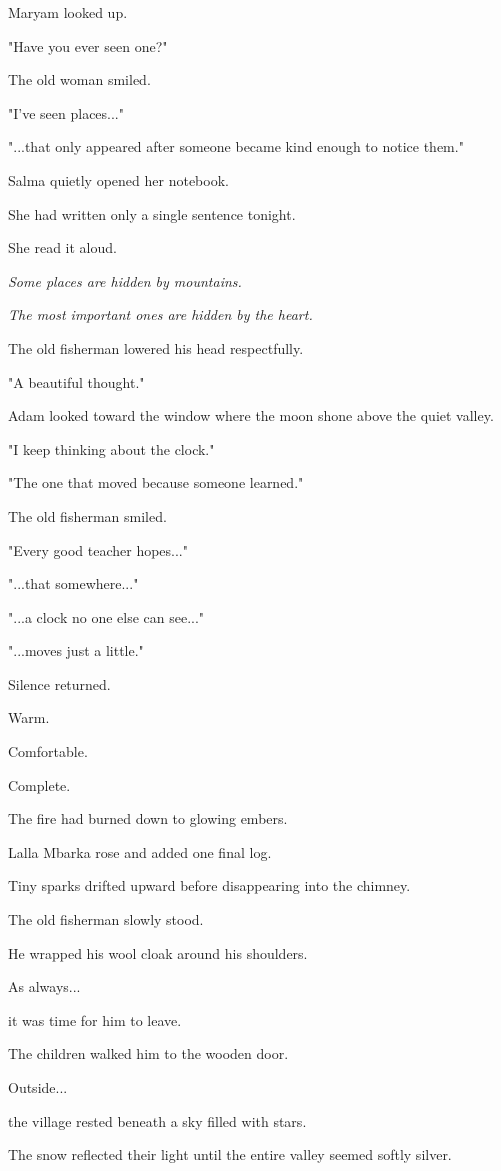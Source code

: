 \documentclass[12pt,openany]{book}
\begin{document}
Maryam looked up.

"Have you ever seen one?"

The old woman smiled.

"I've seen places..."

"...that only appeared after someone became kind enough to notice them."

Salma quietly opened her notebook.

She had written only a single sentence tonight.

She read it aloud.

\emph{Some places are hidden by mountains.}

\emph{The most important ones are hidden by the heart.}

The old fisherman lowered his head respectfully.

"A beautiful thought."

Adam looked toward the window where the moon shone above the quiet valley.

"I keep thinking about the clock."

"The one that moved because someone learned."

The old fisherman smiled.

"Every good teacher hopes..."

"...that somewhere..."

"...a clock no one else can see..."

"...moves just a little."

Silence returned.

Warm.

Comfortable.

Complete.

The fire had burned down to glowing embers.

Lalla Mbarka rose and added one final log.

Tiny sparks drifted upward before disappearing into the chimney.

The old fisherman slowly stood.

He wrapped his wool cloak around his shoulders.

As always...

it was time for him to leave.

The children walked him to the wooden door.

Outside...

the village rested beneath a sky filled with stars.

The snow reflected their light until the entire valley seemed softly silver.
\end{document}
